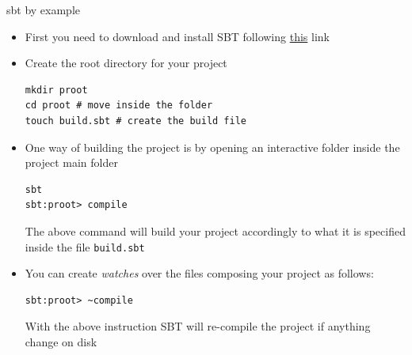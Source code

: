 \documentclass[presentation, aspectratio=169]{beamer}
\begin{document}
\begin{frame}[label={sec:org4a564e3},fragile]{sbt by example}
 \begin{itemize}
\item First you need to download and install SBT following  \href{https://www.scala-sbt.org/1.x/docs/index.html}{\alert{this}} link
\item Create the root directory for your project 
\begin{verbatim}
mkdir proot
cd proot # move inside the folder
touch build.sbt # create the build file
\end{verbatim}
\item One way of building the project is by opening an interactive folder inside the project main folder
\begin{verbatim}
sbt
sbt:proot> compile
\end{verbatim}
The above command will build your project accordingly to what it is specified inside the file \texttt{build.sbt}
\end{itemize}
\begin{itemize}
\item You can create \emph{watches} over the files composing your project as follows:
\begin{verbatim}
sbt:proot> ~compile
\end{verbatim}
With the above instruction SBT will re-compile the project if anything change on disk
\end{itemize}
\end{frame}
\end{document}
